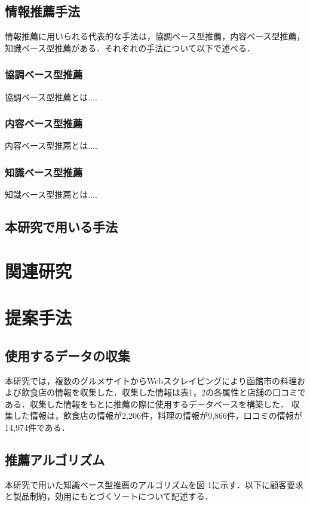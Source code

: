 \documentclass{funthesis}
\begin{document}
\section{情報推薦手法}
情報推薦に用いられる代表的な手法は，協調ベース型推薦，内容ベース型推薦，知識ベース型推薦がある．それぞれの手法について以下で述べる．

\subsection{協調ベース型推薦}
協調ベース型推薦とは....

\subsection{内容ベース型推薦}
内容ベース型推薦とは....

\subsection{知識ベース型推薦}
知識ベース型推薦とは....

\section{本研究で用いる手法}

\chapter{関連研究}%

\chapter{提案手法}

\section{使用するデータの収集}
本研究では，複数のグルメサイトからWebスクレイピングにより函館市の料理および飲食店の情報を収集した．収集した情報は表1，2の各属性と店舗の口コミである．収集した情報をもとに推薦の際に使用するデータベースを構築した．
収集した情報は，飲食店の情報が2,206件，料理の情報が9,866件，口コミの情報が14,974件である．

\section{推薦アルゴリズム}
本研究で用いた知識ベース型推薦のアルゴリズムを図 1に示す．以下に顧客要求と製品制約，効用にもとづくソートについて記述する．
\end{document}
